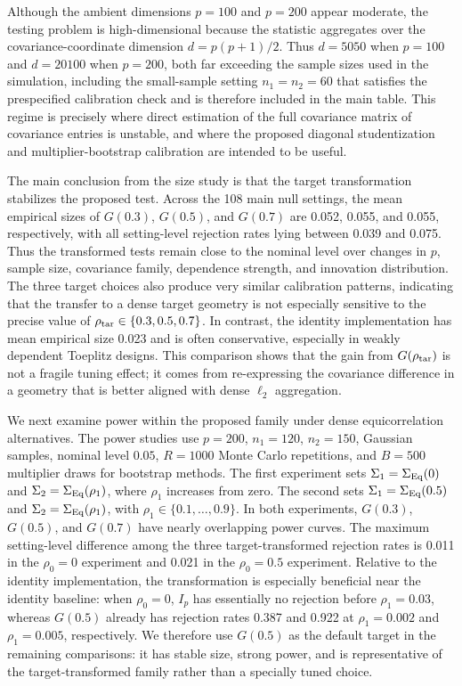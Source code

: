 \documentclass[
  12pt]{article}
\theoremstyle{plain}
\theoremstyle{definition}
\theoremstyle{remark}
\begin{document}


Although the ambient dimensions \(p=100\) and \(p=200\) appear moderate, the
testing problem is high-dimensional because the statistic aggregates over
the covariance-coordinate dimension \(d=p(p+1)/2\).  Thus \(d=5050\) when
\(p=100\) and \(d=20100\) when \(p=200\), both far exceeding the sample sizes
used in the simulation, including the small-sample setting \(n_1=n_2=60\)
that satisfies the prespecified calibration check and is therefore included in
the main table.  This regime is precisely where direct estimation of
the full covariance matrix of covariance entries is unstable, and where the
proposed diagonal studentization and multiplier-bootstrap calibration are
intended to be useful.



The main conclusion from the size study is that the target transformation
stabilizes the proposed test.  Across the 108 main null settings, the mean
empirical sizes of \(G(0.3)\), \(G(0.5)\), and \(G(0.7)\) are 0.052, 0.055,
and 0.055, respectively, with all setting-level rejection rates lying between
0.039 and 0.075.  Thus the transformed tests remain close to the nominal level
over changes in \(p\), sample size, covariance family, dependence strength, and
innovation distribution.  The three target choices also produce very similar
calibration patterns, indicating that the transfer to a dense target geometry
is not especially sensitive to the precise value of
\(\rho_{\rm tar}\in\{0.3,0.5,0.7\}\).  In contrast, the identity implementation
has mean empirical size 0.023 and is often conservative, especially in weakly
dependent Toeplitz designs.  This comparison shows that the gain from
\(G(\rho_{\rm tar})\) is not a fragile tuning effect; it comes from
re-expressing the covariance difference in a geometry that is better aligned
with dense \(\ell_2\) aggregation.

We next examine power within the proposed family under dense equicorrelation
alternatives.  The power studies use \(p=200\), \(n_1=120\), \(n_2=150\),
Gaussian samples, nominal level \(0.05\), \(R=1000\) Monte Carlo repetitions,
and \(B=500\) multiplier draws for bootstrap methods.  The first experiment
sets \(\Sigma_1=\Sigma_{\rm Eq}(0)\) and
\(\Sigma_2=\Sigma_{\rm Eq}(\rho_1)\), where \(\rho_1\) increases from zero.
The second sets \(\Sigma_1=\Sigma_{\rm Eq}(0.5)\) and
\(\Sigma_2=\Sigma_{\rm Eq}(\rho_1)\), with
\(\rho_1\in\{0.1,\ldots,0.9\}\).  In both experiments, \(G(0.3)\),
\(G(0.5)\), and \(G(0.7)\) have nearly overlapping power curves.  The maximum
setting-level difference among the three target-transformed rejection rates is
0.011 in the \(\rho_0=0\) experiment and 0.021 in the \(\rho_0=0.5\)
experiment.  Relative to the identity implementation, the transformation is
especially beneficial near the identity baseline: when \(\rho_0=0\), \(I_p\)
has essentially no rejection before \(\rho_1=0.03\), whereas \(G(0.5)\) already
has rejection rates 0.387 and 0.922 at \(\rho_1=0.002\) and
\(\rho_1=0.005\), respectively.  We therefore use \(G(0.5)\) as the default
target in the remaining comparisons: it has stable size, strong power, and is
representative of the target-transformed family rather than a specially tuned
choice.
\end{document}
